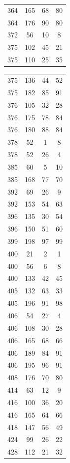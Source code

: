 \documentclass[12pt]{amsproc} %
\theoremstyle{definition}\newtheorem{defn}[thm]{Definition}
\theoremstyle{definition}\newtheorem{rem}[thm]{Remark}
\theoremstyle{definition}\newtheorem{ex}[thm]{Example}
\begin{document}
\begin{table}[ht]
\begin{minipage}{0.25\textwidth}
\begin{tabular}{c|c|c|c}
		364 & 165 & 68 & 80 \\ 
		364 & 176 & 90 & 80 \\ 
		372 & 56 & 10 & 8 \\
		375 & 102 & 45 & 21 \\
		375 & 110 & 25 & 35 \\
        \end{tabular}
    \end{minipage}
    \hfill
    \begin{minipage}{0.25\textwidth}
        \centering
        \begin{tabular}{c|c|c|c}
		375 & 136 & 44 & 52 \\
		375 & 182 & 85 & 91 \\ 
		376 & 105 & 32 & 28 \\ 
		376 & 175 & 78 & 84 \\ 
		376 & 180 & 88 & 84 \\ 
		378 & 52 & 1 & 8 \\ 
		378 & 52 & 26 & 4 \\ 
		385 & 60 & 5 & 10 \\ 
		385 & 168 & 77 & 70 \\ 
		392 & 69 & 26 & 9 \\ 
		392 & 153 & 54 & 63 \\ 
		396 & 135 & 30 & 54 \\ 
		396 & 150 & 51 & 60 \\ 
		399 & 198 & 97 & 99 \\ 
		400 & 21 & 2 & 1 \\ 
		400 & 56 & 6 & 8 \\ 
		400 & 133 & 42 & 45 \\ 
		405 & 132 & 63 & 33 \\ 
		405 & 196 & 91 & 98 \\ 
		406 & 54 & 27 & 4 \\ 
		406 & 108 & 30 & 28 \\ 
		406 & 165 & 68 & 66 \\ 
		406 & 189 & 84 & 91 \\ 
		406 & 195 & 96 & 91 \\ 
		408 & 176 & 70 & 80 \\ 
		414 & 63 & 12 & 9 \\ 
		416 & 100 & 36 & 20 \\ 
		416 & 165 & 64 & 66 \\ 
		418 & 147 & 56 & 49 \\ 
		424 & 99 & 26 & 22 \\ 
		428 & 112 & 21 & 32 \\ 

\end{tabular}
\end{minipage}
\end{table}
\end{document}
